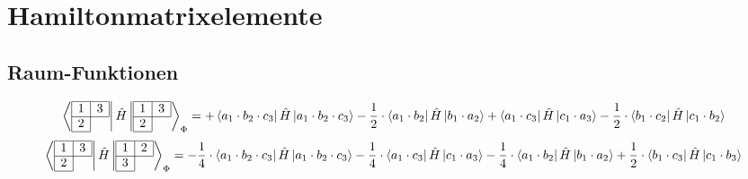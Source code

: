 \documentclass[fleqn]{article}%
\begin{document}
\section{Hamiltonmatrixelemente}%
\label{sec:Hamiltonmatrixelemente}%

%
\subsection{Raum{-}Funktionen}%
\label{subsec:Raum{-}Funktionen}%

%
\vspace{0.25cm}%
\vspace{0.25cm}%
\begin{dmath*}\bra{\begin{array}{|c|c|} \hline 1 & 3\\ \cline{1-2} 2\\ \cline{1-1} \end{array} }\hat{H}\ket{\begin{array}{|c|c|} \hline 1 & 3\\ \cline{1-2} 2\\ \cline{1-1} \end{array} }_{\Phi} = + \bra{ a_{1} \cdot b_{2} \cdot c_{3} } \hat{H} \ket{ a_{1} \cdot b_{2} \cdot c_{3}}- \frac{1}{2}  \cdot \bra{ a_{1} \cdot b_{2} } \hat{H} \ket{ b_{1} \cdot a_{2}}+ \bra{ a_{1} \cdot c_{3} } \hat{H} \ket{ c_{1} \cdot a_{3}}- \frac{1}{2}  \cdot \bra{ b_{1} \cdot c_{2} } \hat{H} \ket{ c_{1} \cdot b_{2}}\end{dmath*}%
\vspace{0.25cm}%
\begin{dmath*}\bra{\begin{array}{|c|c|} \hline 1 & 3\\ \cline{1-2} 2\\ \cline{1-1} \end{array} }\hat{H}\ket{\begin{array}{|c|c|} \hline 1 & 2\\ \cline{1-2} 3\\ \cline{1-1} \end{array} }_{\Phi} = - \frac{1}{4}  \cdot \bra{ a_{1} \cdot b_{2} \cdot c_{3} } \hat{H} \ket{ a_{1} \cdot b_{2} \cdot c_{3}}- \frac{1}{4}  \cdot \bra{ a_{1} \cdot c_{3} } \hat{H} \ket{ c_{1} \cdot a_{3}}- \frac{1}{4}  \cdot \bra{ a_{1} \cdot b_{2} } \hat{H} \ket{ b_{1} \cdot a_{2}}+ \frac{1}{2}  \cdot \bra{ b_{1} \cdot c_{3} } \hat{H} \ket{ c_{1} \cdot b_{3}}\end{dmath*}%
\vspace{0.25cm}%
\end{document}
